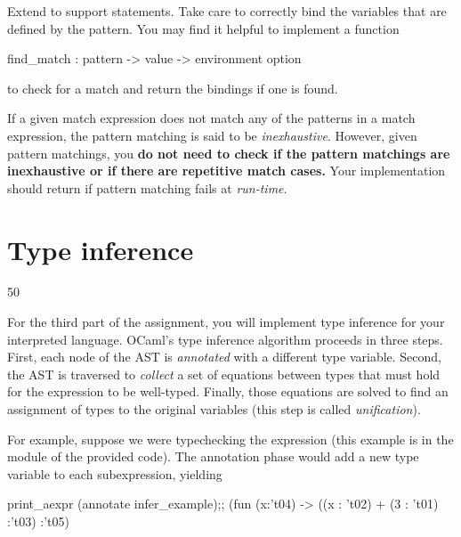 \documentclass{pset}
\begin{document}
Extend  to support  statements.  Take care to correctly
bind the variables that are defined by the pattern.  You may find it helpful to
implement a function
  \begin{ocaml}
    find_match : pattern -> value -> environment option
  \end{ocaml}
to check for a match and return the bindings if one is found.

If a given match expression does not match any of the patterns in a match
expression, the pattern matching is said to be \emph{inexhaustive}. However,
given pattern matchings, you \textbf{do not need to check if the pattern
matchings are inexhaustive or if there are repetitive match cases.} Your
implementation should return  if pattern matching fails at
\emph{run-time}.

\newpage{}
\part{Type inference}{50}
\label{part:infer}

For the third part of the assignment, you will implement type inference for your
interpreted language.  OCaml's type inference algorithm proceeds in three steps.
First, each node of the AST is \emph{annotated} with a different type variable.
Second, the AST is traversed to \emph{collect} a set of equations between types
that must hold for the expression to be well-typed.  Finally, those equations
are solved to find an assignment of types to the original variables (this step
is called \emph{unification}).

For example, suppose we were typechecking the expression 
(this example is  in the  module of the
provided code).  The annotation phase would add a new type variable to each
subexpression, yielding
\begin{ocaml}
print_aexpr (annotate infer_example);;
  (fun (x:'t04) -> ((x : 't02) + (3 : 't01) :'t03) :'t05)
\end{ocaml}
\begin{center}
\end{center}
\end{document}
